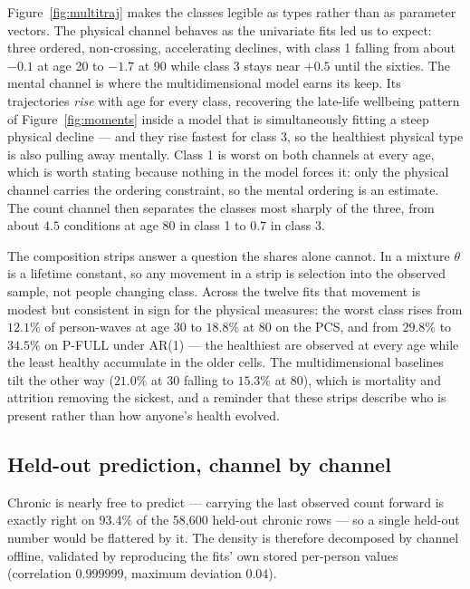 \documentclass[11pt]{article}
\begin{document}
Figure~\ref{fig:multitraj} makes the classes legible as types rather than as
parameter vectors. The physical channel behaves as the univariate fits led us
to expect: three ordered, non-crossing, accelerating declines, with class 1
falling from about $-0.1$ at age 20 to $-1.7$ at 90 while class 3 stays near
$+0.5$ until the sixties. The mental channel is where the multidimensional
model earns its keep. Its trajectories \emph{rise} with age for every class,
recovering the late-life wellbeing pattern of Figure~\ref{fig:moments} inside a
model that is simultaneously fitting a steep physical decline --- and they
rise fastest for class 3, so the healthiest physical type is also pulling
away mentally. Class 1 is worst on both channels at every age, which is worth
stating because nothing in the model forces it: only the physical channel
carries the ordering constraint, so the mental ordering is an estimate. The
count channel then separates the classes most sharply of the three, from
about $4.5$ conditions at age 80 in class 1 to $0.7$ in class 3.

The composition strips answer a question the shares alone cannot. In a
mixture $\theta$ is a lifetime constant, so any movement in a strip is
selection into the observed sample, not people changing class. Across the
twelve fits that movement is modest but consistent in sign for the physical
measures: the worst class rises from $12.1\%$ of person-waves at age 30 to
$18.8\%$ at 80 on the PCS, and from $29.8\%$ to $34.5\%$ on P-FULL under
AR(1) --- the healthiest are observed at every age while the least healthy
accumulate in the older cells. The multidimensional baselines tilt the other
way ($21.0\%$ at 30 falling to $15.3\%$ at 80), which is mortality and
attrition removing the sickest, and a reminder that these strips describe who
is present rather than how anyone's health evolved.

\subsection*{Held-out prediction, channel by channel}

Chronic is nearly free to predict --- carrying the last observed count
forward is exactly right on $93.4\%$ of the 58{,}600 held-out chronic rows
--- so a single held-out number would be flattered by it. The density is
therefore decomposed by channel offline, validated by reproducing the fits'
own stored per-person values (correlation $0.999999$, maximum deviation
$0.04$).
\end{document}
